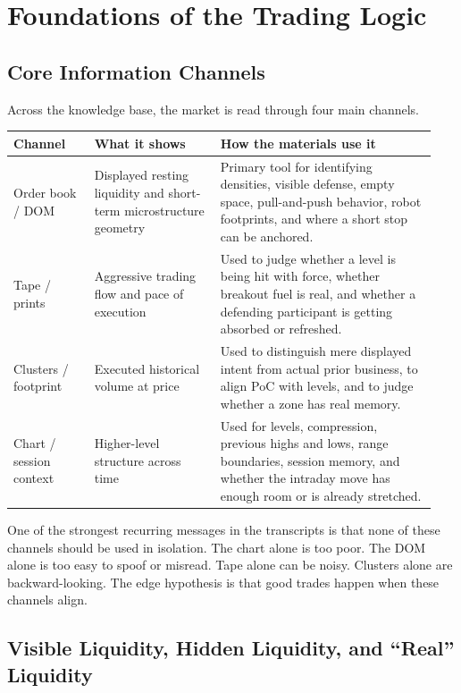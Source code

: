 \section{Foundations of the Trading Logic}

\subsection{Core Information Channels}

Across the knowledge base, the market is read through four main channels.

\begin{longtable}{p{0.18\linewidth}p{0.28\linewidth}p{0.48\linewidth}}
\toprule
\textbf{Channel} & \textbf{What it shows} & \textbf{How the materials use it} \\
\midrule
Order book / DOM & Displayed resting liquidity and short-term microstructure geometry & Primary tool for identifying densities, visible defense, empty space, pull-and-push behavior, robot footprints, and where a short stop can be anchored. \\
Tape / prints & Aggressive trading flow and pace of execution & Used to judge whether a level is being hit with force, whether breakout fuel is real, and whether a defending participant is getting absorbed or refreshed. \\
Clusters / footprint & Executed historical volume at price & Used to distinguish mere displayed intent from actual prior business, to align PoC with levels, and to judge whether a zone has real memory. \\
Chart / session context & Higher-level structure across time & Used for levels, compression, previous highs and lows, range boundaries, session memory, and whether the intraday move has enough room or is already stretched. \\
\bottomrule
\end{longtable}

One of the strongest recurring messages in the transcripts is that none of these channels should be used in isolation.
The chart alone is too poor.
The DOM alone is too easy to spoof or misread.
Tape alone can be noisy.
Clusters alone are backward-looking.
The edge hypothesis is that good trades happen when these channels align.

\subsection{Visible Liquidity, Hidden Liquidity, and ``Real'' Liquidity}

